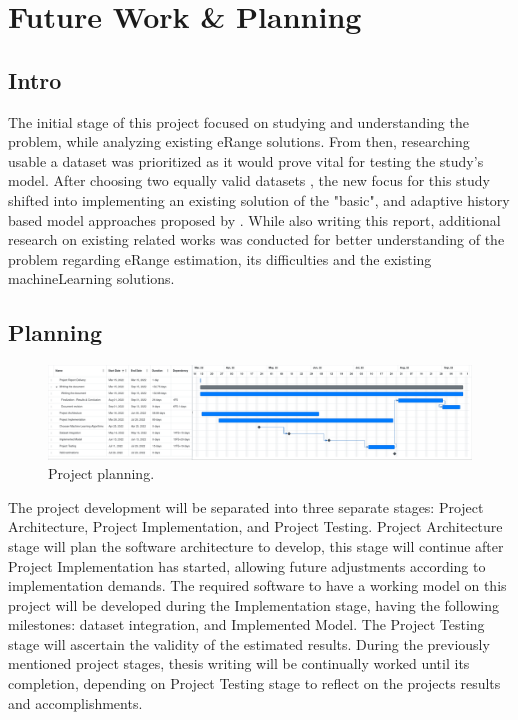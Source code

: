 \chapter{Future Work \& Planning}
\label{cha:planning}
\section{Intro}
\label{sec:planningIntro}
The initial stage of this project focused on 
studying and understanding the problem,
while analyzing existing \gls{eRange} solutions.
From then, researching usable a \gls{dataset}
was prioritized as it would prove vital
for testing the study's model.
After choosing two equally valid \glspl{dataset}
\citep{vedDataset, emobpy}, the new focus for 
this study shifted into implementing an existing
solution of the "basic", and adaptive history 
based model approaches proposed by \citep{classicEVX}.
While also writing this report,
additional research on existing related works 
was conducted for better understanding
of the problem regarding \gls{eRange} estimation, 
its difficulties and the existing 
\gls{machineLearning} solutions.

\section{Planning}
\label{sec:planningPlanning}

\begin{figure}[H]
    \begin{center}
        \includegraphics[scale=0.20]{../figures/planning}
        \caption{Project planning.}
    \end{center}
\end{figure}

The project development will be separated into three 
separate stages: Project Architecture, 
Project Implementation, and Project Testing.
Project Architecture stage will plan the software
architecture to develop, this stage will continue 
after Project Implementation has started, allowing
future adjustments according to implementation demands.
The required software to have a working model on this project
will be developed during the Implementation stage,
having the following milestones: \Gls{dataset} integration, 
and Implemented Model. The Project Testing stage
will ascertain the validity of the estimated results. 
During the previously mentioned project stages, 
thesis writing will be continually worked until
its completion, depending on Project Testing stage
to reflect on the projects results and accomplishments.
